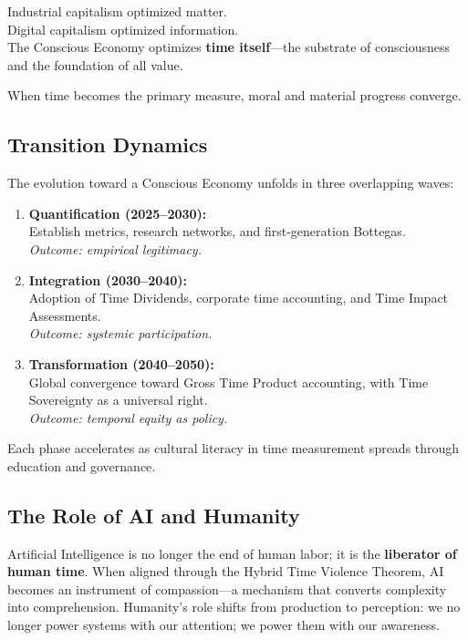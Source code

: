 Industrial capitalism optimized matter.\\
Digital capitalism optimized information.\\
The Conscious Economy optimizes \textbf{time itself}—the substrate of consciousness and the foundation of all value.

When time becomes the primary measure, moral and material progress converge.

\subsection{Transition Dynamics}
\label{sec:transition-dynamics}

The evolution toward a Conscious Economy unfolds in three overlapping waves:

\begin{enumerate}
    \item \textbf{Quantification (2025–2030):}\\
    Establish metrics, research networks, and first-generation Bottegas.\\
    \textit{Outcome: empirical legitimacy.}
    
    \item \textbf{Integration (2030–2040):}\\
    Adoption of Time Dividends, corporate time accounting, and Time Impact Assessments.\\
    \textit{Outcome: systemic participation.}
    
    \item \textbf{Transformation (2040–2050):}\\
    Global convergence toward Gross Time Product accounting, with Time Sovereignty as a universal right.\\
    \textit{Outcome: temporal equity as policy.}
\end{enumerate}

Each phase accelerates as cultural literacy in time measurement spreads through education and governance.

\subsection{The Role of AI and Humanity}
\label{sec:ai-humanity-role}

Artificial Intelligence is no longer the end of human labor; it is the \textbf{liberator of human time}. When aligned through the Hybrid Time Violence Theorem, AI becomes an instrument of compassion—a mechanism that converts complexity into comprehension. Humanity's role shifts from production to perception: we no longer power systems with our attention; we power them with our awareness.

